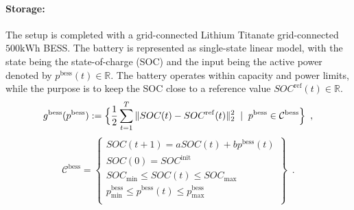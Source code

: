 \documentclass[envcountsect]{svjour3}
\newcommand{\reals}{{\mathbb{R} }}
\begin{document}
\paragraph{Storage:} The setup is completed with a grid-connected Lithium Titanate grid-connected $500\mathrm{kWh}$ BESS.
The battery is represented as single-state linear model, with the state being the state-of-charge (SOC) and the input being the active power denoted by $p^\mathrm{bess}(t)\in\reals$. The battery operates within capacity and power limits, while the purpose is to keep the SOC close to a reference value $SOC^\mathrm{ref}(t)\in\reals$.
\begin{equation}{\label{eq::BESSProgram}}
g^\mathrm{bess}(p^\mathrm{bess}) := \Big\{\frac{1}{2}\sum_{t=1}^T\|SOC(t)-SOC^\mathrm{ref}(t)\|^2_2
                                             \;\mid\;p^\mathrm{bess}\in\mathcal{C}^\mathrm{bess} \Big\}\enspace,
\end{equation}
\[
\mathcal{C}^\mathrm{bess} =
\left \{
                  \begin{array}{ll}
                    SOC(t+1) = a SOC(t) + b p^\mathrm{bess}(t) \\
                    SOC(0) = SOC^\mathrm{init} \\
                    SOC_{\min}  \leq SOC(t) \leq SOC_{\max} \\
                    p_{\min}^\mathrm{bess} \leq p^\mathrm{bess}(t) \leq p_{\max}^\mathrm{bess}\\
                  \end{array}
\right\}\enspace.
\]
\end{document}
